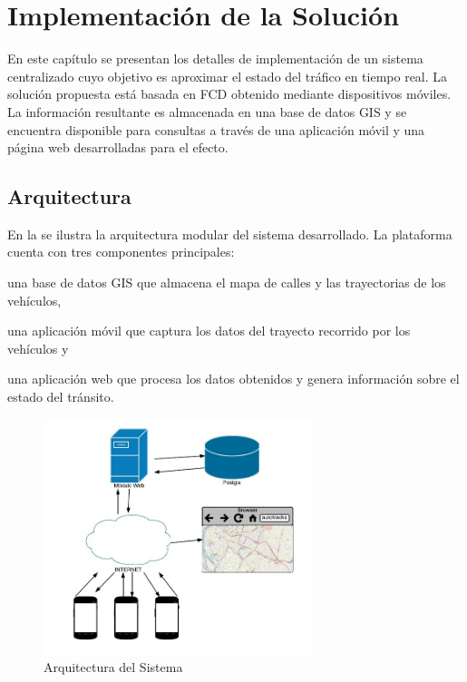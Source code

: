 \chapter{Implementación de la Solución}

En este capítulo se presentan los detalles de implementación de un sistema centralizado cuyo objetivo es aproximar el estado del tráfico en tiempo real. La solución propuesta está basada en FCD obtenido mediante dispositivos móviles. La información resultante es almacenada en una base de datos GIS y se encuentra disponible para consultas a través de una aplicación móvil y una página web desarrolladas para el efecto.

\section{Arquitectura}

En la  se ilustra la arquitectura modular del sistema desarrollado. La plataforma cuenta con tres componentes principales:
\begin{enumerate*}[1)] \item una base de datos GIS que almacena el mapa de calles y las trayectorias de los vehículos, \item una aplicación móvil que captura los datos del trayecto recorrido por los vehículos y \item una aplicación web que procesa los datos obtenidos y genera información sobre el estado del tránsito.
\end{enumerate*}

\begin{figure}[h*]
	\centering
	\includegraphics[width=0.7\textwidth]{capitulos/6/figuras/figura1.jpg}
	\caption{\label{fig:arquitectura} Arquitectura del Sistema}	
\end{figure}

